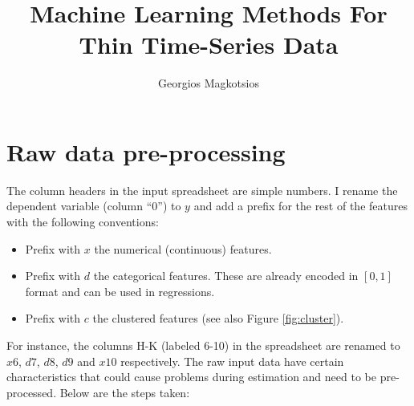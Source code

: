 \documentclass[12pt]{article}
\begin{document}
\title{Machine Learning Methods For Thin Time-Series Data}
\author{Georgios Magkotsios}
\maketitle
\thispagestyle{empty}


\onehalfspacing



\section{Raw data pre-processing}


The column headers in the input spreadsheet are simple numbers. I rename the dependent variable (column ``0'') to $y$ and add a prefix for the rest of the features with the following conventions:
\begin{itemize}
	\item Prefix with $x$ the numerical (continuous) features.
	\item Prefix with $d$ the categorical features. These are already encoded in $[0,1]$ format and can be used in regressions.
	\item Prefix with $c$ the clustered features (see also Figure \ref{fig:cluster}).
\end{itemize}
For instance, the columns H-K (labeled 6-10) in the spreadsheet are renamed to $x6$, $d7$, $d8$, $d9$ and $x10$ respectively. The raw input data have certain characteristics that could cause problems during estimation and need to be pre-processed. Below are the steps taken:
\end{document}
